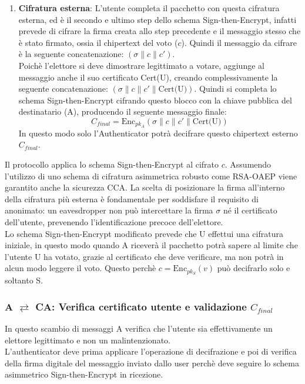 \begin{enumerate}
			\item \textbf{Cifratura esterna}: L'utente completa il pacchetto con questa cifratura esterna, ed è il secondo e ultimo step dello schema Sign-then-Encrypt, infatti prevede di cifrare la firma creata allo step precedente e il messaggio stesso che è stato firmato, ossia il chipertext del voto ($c$). Quindi il messaggio da cifrare è la seguente concatenazione: $(\sigma\|c\|c')$.\\
			Poichè l'elettore si deve dimostrare legittimato a votare, aggiunge al messaggio anche il suo certificato Cert(U), creando complessivamente la seguente concatenazione: $(\sigma\|c\|c'\|\text{Cert(U)})$. Quindi si completa lo schema Sign-then-Encrypt cifrando questo blocco con la chiave pubblica del destinatario (A), producendo il seguente messaggio finale:
			$$ C_{final} = \text{Enc}_{pk_A}(\sigma \| c\| c'\| \text{Cert(U)}) $$
			In questo modo solo l'Authenticator potrà decifrare questo chipertext esterno $ C_{final} $.
		\end{enumerate}
		
		Il protocollo applica lo schema Sign-then-Encrypt al cifrato $c$. Assumendo l'utilizzo di uno schema di cifratura asimmetrica robusto come RSA-OAEP viene garantito anche la sicurezza CCA. La scelta di posizionare la firma all'interno della cifratura più esterna è fondamentale per soddisfare il requisito di anonimato: un eavesdropper non può intercettare la firma $\sigma$ né il certificato dell'utente, prevenendo l'identificazione precoce dell'elettore.\\
		
		Lo schema Sign-then-Encrypt modificato prevede che U effettui una cifratura iniziale, in questo modo quando A riceverà il pacchetto potrà sapere al limite che l'utente U ha votato, grazie al certificato che deve verificare, ma non potrà in alcun modo leggere il voto. Questo perchè $ c = \text{Enc}_{pk_S}(v) $ può decifrarlo solo e soltanto S.
		
		
		
	\subsubsection{A $\rightleftarrows$ CA: Verifica certificato utente e validazione $C_{final}$}
		In questo scambio di messaggi A verifica che l'utente sia effettivamente un elettore legittimato e non un malintenzionato.\\
		L'authenticator deve prima applicare l'operazione di decifrazione e poi di verifica della firma digitale del messaggio inviato dallo user perchè deve seguire lo schema asimmetrico Sign-then-Encrypt in ricezione.
		
